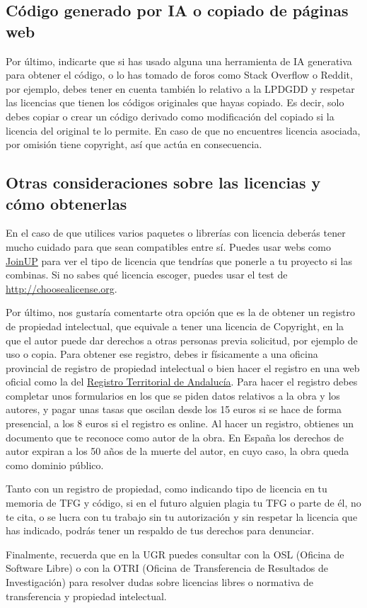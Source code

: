 \subsection{Código generado por IA o copiado de páginas web}

Por último, indicarte que si has usado alguna una herramienta de IA generativa para obtener el código, o lo has tomado de foros como Stack Overflow o Reddit, por ejemplo, debes tener en cuenta también lo relativo a la LPDGDD y respetar las licencias que tienen los códigos originales que hayas copiado. Es decir, solo debes copiar o crear un código derivado como modificación del copiado si la licencia del original te lo permite. En caso de que no encuentres licencia asociada, por omisión tiene copyright, así que actúa en consecuencia.


\subsection{Otras consideraciones sobre las licencias y cómo obtenerlas}

En el caso de que utilices varios paquetes o librerías con licencia deberás tener mucho cuidado para que sean compatibles entre sí. Puedes usar webs como \href{https://joinup.ec.europa.eu/collection/eupl/soluti on/joinup-licensing-assistant/jla-compatibility-ch ecker}{JoinUP} para ver el tipo de licencia que tendrías que ponerle a tu proyecto si las combinas. Si no sabes qué licencia escoger, puedes usar el test de \url{http://choosealicense.org}.

Por último, nos gustaría comentarte otra opción que es la de obtener un registro de propiedad intelectual, que equivale a tener una licencia de Copyright, en la que el autor puede dar derechos a otras personas previa solicitud, por ejemplo de uso o copia. Para obtener ese registro, debes ir físicamente a una oficina provincial de registro de propiedad intelectual o bien hacer el registro en una web oficial como la del \href{https://www.juntadeandalucia.es/organismos/turismoculturaydeporte/servicios/procedimientos/detalle/297.html}{Registro Territorial de Andalucía}. Para hacer el registro debes completar unos formularios en los que se piden datos relativos a la obra y los autores, y pagar unas tasas que oscilan desde los 15 euros si se hace de forma presencial, a los 8 euros si el registro es online. Al hacer un registro, obtienes un documento que te reconoce como autor de la obra. En España los derechos de autor expiran a los 50 años de la muerte del autor, en cuyo caso, la obra queda como dominio público.

Tanto con un registro de propiedad, como indicando tipo de licencia en tu memoria de TFG y código, si en el futuro alguien plagia tu TFG o parte de él, no te cita, o se lucra con tu trabajo sin tu autorización y sin respetar la licencia que has indicado, podrás tener un respaldo de tus derechos para denunciar.

Finalmente, recuerda que en la UGR puedes consultar con la OSL (Oficina de Software Libre) o con la OTRI (Oficina de Transferencia de Resultados de Investigación) para resolver dudas sobre licencias libres o normativa de transferencia y propiedad intelectual.
